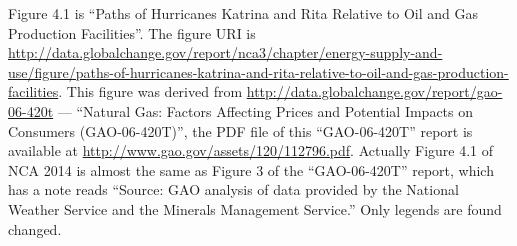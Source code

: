 Figure 4.1 is ``Paths of Hurricanes Katrina and Rita Relative to Oil and Gas Production Facilities''. The
figure URI is \url{http://data.globalchange.gov/report/nca3/chapter/energy-supply-and-use/figure/paths-of-hurricanes-katrina-and-rita-relative-to-oil-and-gas-production-facilities}.
This figure was derived from \url{http://data.globalchange.gov/report/gao-06-420t} --- ``Natural Gas: Factors Affecting Prices and Potential Impacts on Consumers (GAO-06-420T)'', the 
PDF file of this ``GAO-06-420T'' report is available at \url{http://www.gao.gov/assets/120/112796.pdf}.
Actually Figure 4.1 of NCA 2014 is almost the same as Figure 3 of the ``GAO-06-420T'' report, which has a note reads ``Source: GAO analysis of data provided by the National Weather Service and the Minerals Management Service.''
Only legends are found changed.

